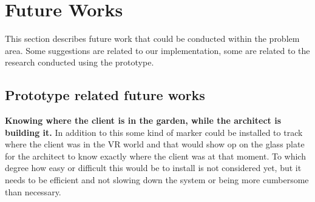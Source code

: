 \chapter{Future Works}
This section describes future work that could be conducted within the problem area. Some suggestions are related to our implementation, some are related to the research conducted using the prototype.
\section{Prototype related future works}
\textbf{Knowing where the client is in the garden, while the architect is building it.} In addition to this some kind of marker could be installed to track where the client was in the VR world and that would show op on the glass plate for the architect to know exactly where the client was at that moment. To which degree how easy or difficult this would be to install is not considered yet, but it needs to be efficient and not slowing down the system or being more cumbersome than necessary.\\

